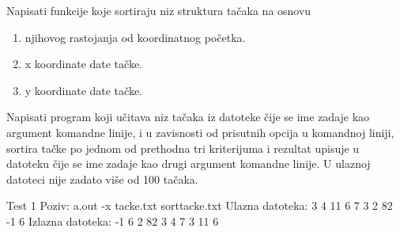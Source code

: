 \begin{Exercise}[label=507]
  Napisati funkcije koje sortiraju niz struktura ta\v{c}aka na
  osnovu
\begin{enumerate}
\item njihovog rastojanja od koordinatnog po\v{c}etka.
\item x koordinate date ta\v{c}ke.
\item y koordinate date ta\v{c}ke.
\end{enumerate}
Napisati program koji u\v{c}itava niz ta\v{c}aka iz datoteke \v{c}ije
se ime zadaje kao argument komandne linije, i u zavisnosti od
prisutnih opcija u komandnoj liniji, sortira ta\v{c}ke po jednom od
prethodna tri kriterijuma i rezultat upisuje u datoteku \v{c}ije se
ime zadaje kao drugi argument komandne linije. U ulaznoj datoteci nije
zadato vi\v{s}e od 100 ta\v{c}aka.
  
  \begin{miditest}
    \begin{test}{Test 1}
Poziv:  a.out -x tacke.txt sorttacke.txt
Ulazna datoteka:   3 4
                   11 6
                   7 3
                   2 82
                   -1 6
Izlazna datoteka:  -1 6
                   2 82
                   3 4
                   7 3
                   11 6
    \end{test}
  \end{miditest}
  
\end{Exercise}

